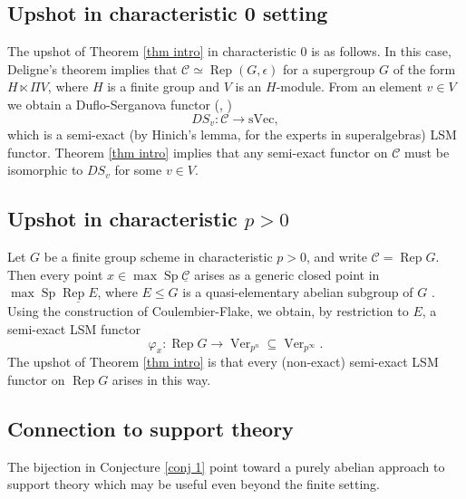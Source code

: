 \documentclass[11pt]{amsart}
\def\Cs{\mathcal{C}}
\def\Cs{\mathscr{C}}
\def\Rep{\operatorname{Rep}}
\def\Ver{\operatorname{Ver}}
\def\ul{\underline}
\def\sub{\subseteq}
\def\sVec{\text{sVec}}
\def\Sp{\operatorname{Sp}}
\theoremstyle{definition}
\theoremstyle{remark}
\numberwithin{equation}{section}
\begin{document}
\subsection{Upshot in characteristic 0 setting}  The upshot of Theorem \ref{thm intro} in characteristic 0 is as follows. In this case, Deligne's theorem \cite{Del} implies that $\Cs\simeq\Rep(G,\epsilon)$ for a supergroup $G$ of the form $H\ltimes\Pi V$, where $H$ is a finite group and $V$ is an $H$-module. From an element $v\in V$ we obtain a Duflo-Serganova functor (\cite{DS}, \cite{GHSS})
\[
DS_v:\Cs\to\sVec,
\]
which is a semi-exact (by Hinich's lemma, for the experts in superalgebras) LSM functor.  Theorem \ref{thm intro} implies that any semi-exact functor on $\Cs$ must be isomorphic to $DS_v$ for some $v\in V$.

\subsection{Upshot in characteristic $p>0$}  Let $G$ be a finite group scheme in characteristic $p>0$, and write $\Cs=\Rep G$.  Then every point $x\in\max\Sp\ul{\Cs}$ arises as a generic closed point in $\max\Sp\ul{\Rep E}$, where $E\leq G$ is a quasi-elementary abelian subgroup of $G$ \cite{FP}.  Using the construction of Coulembier-Flake, we obtain, by restriction to $E$, a semi-exact LSM functor
\[
\varphi_x:\Rep G\to\Ver_{p^n}\sub\Ver_{p^\infty}.
\]
The upshot of Theorem \ref{thm intro} is that every (non-exact) semi-exact LSM functor on $\Rep G$ arises in this way.



\subsection{Connection to support theory}  The bijection in Conjecture \ref{conj 1} point toward a purely abelian approach to support theory which may be useful even beyond the finite setting.  
\end{document}
